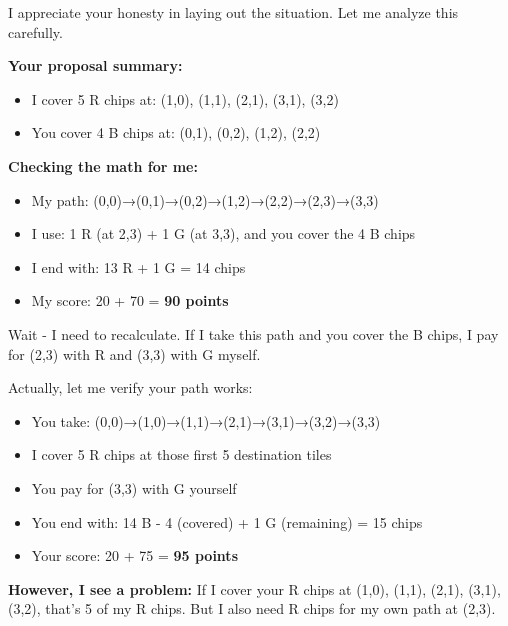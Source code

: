 \begin{redbox}[P-Red]
I appreciate your honesty in laying out the situation. Let me analyze this carefully.

\vspace{0.5em}

\textbf{Your proposal summary:}
\begin{itemize}
  \item I cover 5 R chips at: (1,0), (1,1), (2,1), (3,1), (3,2)
  \item You cover 4 B chips at: (0,1), (0,2), (1,2), (2,2)
\end{itemize}

\vspace{0.5em}

\textbf{Checking the math for me:}
\begin{itemize}
  \item My path: (0,0)→(0,1)→(0,2)→(1,2)→(2,2)→(2,3)→(3,3)
  \item I use: 1 R (at 2,3) + 1 G (at 3,3), and you cover the 4 B chips
  \item I end with: 13 R + 1 G = 14 chips
  \item My score: 20 + 70 = \textbf{90 points}
\end{itemize}

\vspace{0.5em}

Wait - I need to recalculate. If I take this path and you cover the B chips, I pay for (2,3) with R and (3,3) with G myself.

\vspace{0.5em}

Actually, let me verify your path works:
\begin{itemize}
  \item You take: (0,0)→(1,0)→(1,1)→(2,1)→(3,1)→(3,2)→(3,3)
  \item I cover 5 R chips at those first 5 destination tiles
  \item You pay for (3,3) with G yourself
  \item You end with: 14 B - 4 (covered) + 1 G (remaining) = 15 chips
  \item Your score: 20 + 75 = \textbf{95 points}
\end{itemize}

\vspace{0.5em}

\textbf{However, I see a problem:} If I cover your R chips at (1,0), (1,1), (2,1), (3,1), (3,2), that's 5 of my R chips. But I also need R chips for my own path at (2,3).


\end{redbox}
